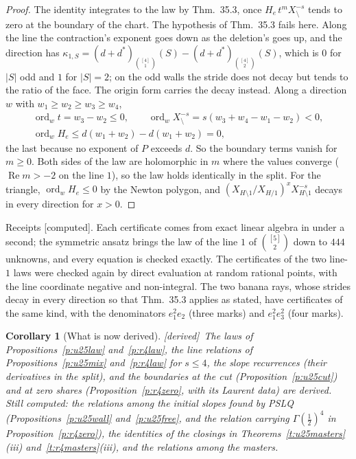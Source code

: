 \documentclass[11pt]{article}
\DeclareMathOperator{\re}{Re}
\theoremstyle{plain}
\newtheorem{corollary}[proposition]{Corollary}
\theoremstyle{definition}
\theoremstyle{remark}
\newcommand{\derived}{\textup{[derived]}}
\newcommand{\computed}{\textup{[computed]}}
\begin{document}
\begin{proof}
The identity integrates to the law by Thm.~35.3, once $H_e\,t^m X_{\setminus}^{-s}$ tends to zero at the boundary of the chart. The hypothesis of Thm.~35.3 fails here. Along the line the contraction's exponent goes down as the deletion's goes up, and the direction has $\kappa_{1,S}=(d+d^\ast)_{\binom{[4]}1}(S)-(d+d^\ast)_{\binom{[4]}2}(S)$, which is $0$ for $|S|$ odd and $1$ for $|S|=2$; on the odd walls the stride does not decay but tends to the ratio of the face. The origin form carries the decay instead. Along a direction $w$ with $w_1\ge w_2\ge w_3\ge w_4$,
\begin{gather*}
\operatorname{ord}_wt=w_3-w_2\le0,\qquad \operatorname{ord}_wX_{\setminus}^{-s}=s(w_3+w_4-w_1-w_2)<0,\\
\operatorname{ord}_wH_e\le d(w_1+w_2)-d(w_1+w_2)=0,
\end{gather*}
the last because no exponent of $P$ exceeds $d$. So the boundary terms vanish for $m\ge0$. Both sides of the law are holomorphic in $m$ where the values converge ($\re m>-2$ on the line $1$), so the law holds identically in the split. For the triangle, $\operatorname{ord}_wH_e\le0$ by the Newton polygon, and $(X_{H\setminus1}/X_{H/1})^xX_{H\setminus1}^{-s}$ decays in every direction for $x>0$.
\end{proof}

\noindent Receipts \computed. Each certificate comes from exact linear algebra in under a second; the symmetric ansatz brings the law of the line $1$ of $\binom{[5]}2$ down to $444$ unknowns, and every equation is checked exactly. The certificates of the two line-$1$ laws were checked again by direct evaluation at random rational points, with the line coordinate negative and non-integral. The two banana rays, whose strides decay in every direction so that Thm.~35.3 applies as stated, have certificates of the same kind, with the denominators $e_1^2e_2$ (three marks) and $e_1^2e_3^2$ (four marks).

\begin{corollary}[What is now derived]\label{c:certs}\derived\
The laws of Propositions~\ref{p:u25law} and~\ref{p:r4law}, the line relations of Propositions~\ref{p:u25mix} and~\ref{p:r4law} for $s\le4$, the slope recurrences (their derivatives in the split), and the boundaries at the cut (Proposition~\ref{p:u25cut}) and at zero shares (Proposition~\ref{p:r4zero}, with its Laurent data) are derived. Still computed: the relations among the initial slopes found by PSLQ (Propositions~\ref{p:u25wall} and~\ref{p:u25free}, and the relation carrying $\Gamma(\frac12)^4$ in Proposition~\ref{p:r4zero}), the identities of the closings in Theorems~\ref{t:u25masters}(iii) and~\ref{t:r4masters}(iii), and the relations among the masters.
\end{corollary}
\end{document}
